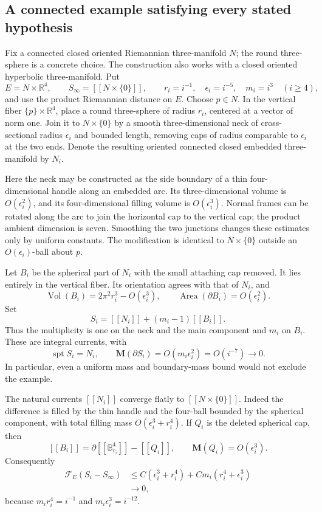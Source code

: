 \documentclass[10pt]{article}
\begin{document}
\subsection*{A connected example satisfying every stated hypothesis}
Fix a connected closed oriented Riemannian three-manifold \(N\); the round three-sphere is a concrete choice. The construction also works with a closed oriented hyperbolic three-manifold. Put \[E=N\times\mathbb R^4,\qquad S_\infty=[\![N\times\{0\}]\!],
 \qquad r_i=i^{-1},\quad \epsilon_i=i^{-5},\quad m_i=i^3
 \quad(i\geq4),\] and use the product Riemannian distance on \(E\). Choose \(p\in N\). In the vertical fiber \(\{p\}\times\mathbb R^4\), place a round three-sphere of radius \(r_i\), centered at a vector of norm one. Join it to \(N\times\{0\}\) by a smooth three-dimensional neck of cross-sectional radius \(\epsilon_i\) and bounded length, removing caps of radius comparable to \(\epsilon_i\) at the two ends. Denote the resulting oriented connected closed embedded three-manifold by \(N_i\).\par
Here the neck may be constructed as the side boundary of a thin four-dimensional handle along an embedded arc. Its three-dimensional volume is \(O(\epsilon_i^2)\), and its four-dimensional filling volume is \(O(\epsilon_i^3)\). Normal frames can be rotated along the arc to join the horizontal cap to the vertical cap; the product ambient dimension is seven. Smoothing the two junctions changes these estimates only by uniform constants. The modification is identical to \(N\times\{0\}\) outside an \(O(\epsilon_i)\)-ball about \(p\).\par
Let \(B_i\) be the spherical part of \(N_i\) with the small attaching cap removed. It lies entirely in the vertical fiber. Its orientation agrees with that of \(N_i\), and \[\operatorname{Vol}(B_i)=2\pi^2 r_i^3-O(\epsilon_i^3),\qquad
 \operatorname{Area}(\partial B_i)=O(\epsilon_i^2).\] Set \[S_i=[\![N_i]\!]+(m_i-1)[\![B_i]\!].\] Thus the multiplicity is one on the neck and the main component and \(m_i\) on \(B_i\). These are integral currents, with \[\operatorname{spt}S_i=N_i,\qquad
 \mathbf M(\partial S_i)=O(m_i\epsilon_i^2)=O(i^{-7})\longrightarrow0.\] In particular, even a uniform mass and boundary-mass bound would not exclude the example.\par
The natural currents \([\![N_i]\!]\) converge flatly to \([\![N\times\{0\}]\!]\). Indeed the difference is filled by the thin handle and the four-ball bounded by the spherical component, with total filling mass \(O(\epsilon_i^3+r_i^4)\). If \(Q_i\) is the deleted spherical cap, then \[[\![B_i]\!]=\partial[\![\mathbb B^4_{r_i}]\!]-[\![Q_i]\!],
 \qquad \mathbf M(Q_i)=O(\epsilon_i^3).\] Consequently \[\begin{aligned}
 \mathcal F_E(S_i-S_\infty)
 &\leq C(\epsilon_i^3+r_i^4)
       +C m_i(r_i^4+\epsilon_i^3)\\
 &\longrightarrow0 ,\end{aligned}\] because \(m_ir_i^4=i^{-1}\) and \(m_i\epsilon_i^3=i^{-12}\).\par
\end{document}
